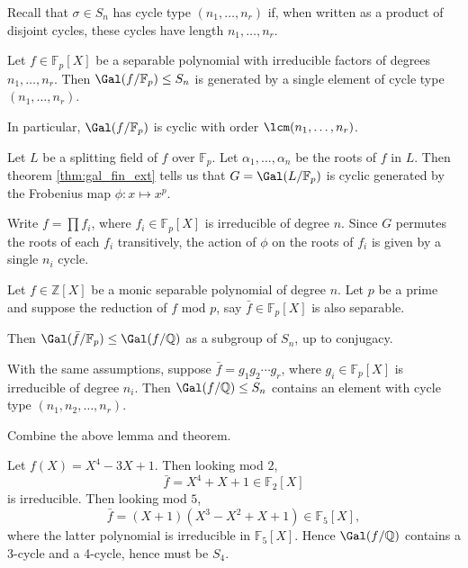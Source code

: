 \documentclass[12pt]{article}
\begin{document}
Recall that $\sigma \in S_n$ has cycle type $(n_1, \ldots, n_r)$ if, when written as a product of disjoint cycles, these cycles have length $n_1, \ldots, n_r$.

\begin{lemma}
	Let $f \in \mathbb{F}_p[X]$ be a separable polynomial with irreducible factors of degrees $n_1, \ldots, n_r$. Then $\Gal(f/ \mathbb{F}_p) \leq S_n$ is generated by a single element of cycle type $(n_1, \ldots, n_r)$.

	In particular, $\Gal(f/ \mathbb{F}_p)$ is cyclic with order $\lcm(n_1, \ldots, n_r)$.
\end{lemma}

\begin{proofbox}
	Let $L$ be a splitting field of $f$ over $\mathbb{F}_p$. Let $\alpha_1, \ldots, \alpha_n$ be the roots of $f$ in $L$. Then theorem \ref{thm:gal_fin_ext} tells us that $G = \Gal(L/\mathbb{F}_p)$ is cyclic generated by the Frobenius map $\phi : x \mapsto x^p$.

	Write $f = \prod f_i$, where $f_i \in \mathbb{F}_p[X]$ is irreducible of degree $n$. Since $G$ permutes the roots of each $f_i$ transitively, the action of $\phi$ on the roots of $f_i$ is given by a single $n_i$ cycle.
\end{proofbox}


\begin{theorem}
	Let $f \in \mathbb{Z}[X]$ be a monic separable polynomial of degree $n$. Let $p$ be a prime and suppose the reduction of $f$ mod $p$, say $\bar f \in \mathbb{F}_p[X]$ is also separable.

	Then $\Gal(\bar f / \mathbb{F}_p) \leq \Gal(f/ \mathbb{Q})$ as a subgroup of $S_n$, up to conjugacy.
\end{theorem}

\begin{corollary}
	With the same assumptions, suppose $\bar f = g_1 g_2 \cdots g_r$, where $g_i \in \mathbb{F}_p[X]$ is irreducible of degree $n_i$. Then $\Gal(f/ \mathbb{Q}) \leq S_n$ contains an element with cycle type $(n_1, n_2, \ldots, n_r)$.
\end{corollary}

\begin{proofbox}
	Combine the above lemma and theorem.
\end{proofbox}

\begin{exbox}
	Let $f(X) = X^4 - 3X + 1$. Then looking mod $2$,
	\[
		\bar f = X^4 + X + 1 \in \mathbb{F}_2[X]
	\]
	is irreducible. Then looking mod $5$,
	\[
		\bar f = (X+1)(X^3 - X^2 + X + 1) \in \mathbb{F}_5[X],
	\]
	where the latter polynomial is irreducible in $\mathbb{F}_5[X]$. Hence $\Gal(f/\mathbb{Q})$ contains a 3-cycle and a 4-cycle, hence must be $S_4$.
\end{exbox}
\end{document}

